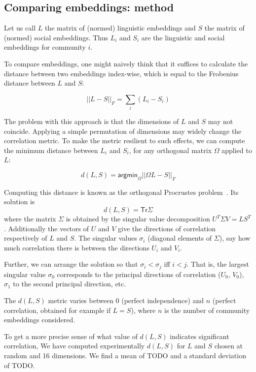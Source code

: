 \documentclass[11pt]{article}
\begin{document}
\subsection{Comparing embeddings: method}

Let us call \(L\) the matrix of (normed) linguistic embeddings and \(S\) the matrix
of (normed) social embeddings. Thus \(L_i\) and \(S_i\) are the linguistic and
social embeddings for community \(i\).

To compare embeddings, one might naively think that it suffices to
calculate the distance between two embeddings index-wise, which is
equal to the Frobenius distance between \(L\) and \(S\):

\[||L-S||_F = \sum_i (L_i - S_i)\]

The problem with this approach is that the dimensions of \(L\) and \(S\) may
not coincide. Applying a simple permutation of dimensions may widely
change the correlation metric. To make the metric resilient to such
effects, we can compute the minimum distance between \(L_i\) and \(S_i\), for
any orthogonal matrix \(\Omega\) applied to \(L\):

\[d(L,S) = \mathsf{argmin}_\Omega ||ΩL-S||_F\]

Computing this distance is known as the orthogonal Procrustes problem~\citep{Gower2004}. Its
solution is
\[d(L,S) = \mathsf {Tr} Σ\] where the matrix \(Σ\) is obtained by the singular value
decomposition \(U^TΣV = LS^T\). Additionally the vectors of \(U\) and \(V\) give
the directions of correlation respectively of \(L\) and \(S\). The
singular values \(\sigma_i\) (diagonal elements of \(Σ\)), say how much
correlation there is between the directions \(U_i\) and \(V_i\).

Further, we can arrange the solution so that \(σ_i < σ_j\) iff \(i < j\). That
is, the largest singular value \(σ_0\) corresponds to the principal
directions of correlation (\(U_0\), \(V_0\)), \(σ_1\) to the second
principal direction, etc. 

The \(d(L,S)\) metric varies between \(0\) (perfect independence) and
\(n\) (perfect correlation, obtained for example if \(L=S\)), where
$n$ is the number of community embeddings considered.

To get a more precise sense of what value of \(d(L,S)\) indicates significant correlation,
We have computed experimentally \(d(L,S)\) for 
\(L\) and \(S\) chosen at random and 16 dimensions. We find
a mean of TODO and a standard deviation of TODO.
\end{document}
